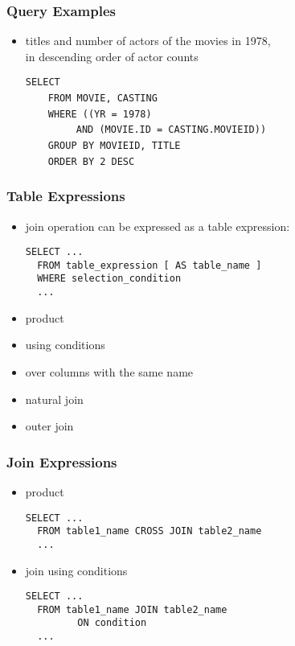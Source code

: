 \documentclass[dvipsnames]{beamer}
\theoremstyle{plain}
\begin{document}
\begin{frame}[fragile]
  \frametitle{Query Examples}

  \begin{itemize}
    \item titles and number of actors of the movies in 1978,\\
      in descending order of actor counts

    \medskip
\lstinline!SELECT! \\
~~~~\lstinline!FROM MOVIE, CASTING!\\
\pause
~~~~\lstinline!WHERE ((YR = 1978)!\\
~~~~~~~~~\lstinline!AND (MOVIE.ID = CASTING.MOVIEID))!\\
\pause
~~~~\lstinline!GROUP BY MOVIEID, TITLE!\\
\pause\pause
~~~~\lstinline!ORDER BY 2 DESC!
  \end{itemize}
\end{frame}

\begin{frame}[fragile]
  \frametitle{Table Expressions}

  \begin{itemize}
    \item join operation can be expressed as a table expression:
    \begin{lstlisting}
SELECT ...
  FROM table_expression [ AS table_name ]
  WHERE selection_condition
  ...
    \end{lstlisting}

    \medskip
    \item product
    \item using conditions
    \item over columns with the same name
    \item natural join
    \item outer join
  \end{itemize}
\end{frame}

\begin{frame}[fragile]
  \frametitle{Join Expressions}

  \begin{itemize}
    \item product
    \begin{lstlisting}
SELECT ...
  FROM table1_name CROSS JOIN table2_name
  ...
    \end{lstlisting}

    \pause
    \medskip
    \item join using conditions
    \begin{lstlisting}
SELECT ...
  FROM table1_name JOIN table2_name
         ON condition
  ...
    \end{lstlisting}
  \end{itemize}
\end{frame}
\end{document}
